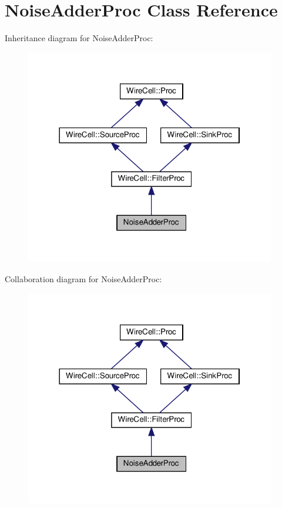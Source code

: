 \hypertarget{class_noise_adder_proc}{}\section{Noise\+Adder\+Proc Class Reference}
\label{class_noise_adder_proc}


Inheritance diagram for Noise\+Adder\+Proc\+:
\nopagebreak
\begin{figure}[H]
\begin{center}
\leavevmode
\includegraphics[width=310pt]{class_noise_adder_proc__inherit__graph}
\end{center}
\end{figure}


Collaboration diagram for Noise\+Adder\+Proc\+:
\nopagebreak
\begin{figure}[H]
\begin{center}
\leavevmode
\includegraphics[width=310pt]{class_noise_adder_proc__coll__graph}
\end{center}
\end{figure}
